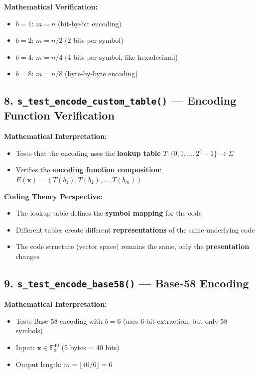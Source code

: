 \documentclass[11pt,a4paper]{article}
\begin{document}
\textbf{Mathematical Verification:}
\begin{itemize}
\item $b = 1$: $m = n$ (bit-by-bit encoding)
\item $b = 2$: $m = n/2$ (2 bits per symbol)
\item $b = 4$: $m = n/4$ (4 bits per symbol, like hexadecimal)
\item $b = 8$: $m = n/8$ (byte-by-byte encoding)
\end{itemize}

\subsection{8. \texttt{s\_test\_encode\_custom\_table()} --- Encoding Function Verification}

\textbf{Mathematical Interpretation:}
\begin{itemize}
\item Tests that the encoding uses the \textbf{lookup table} $T: \{0, 1, \ldots, 2^b-1\} \rightarrow \Sigma$
\item Verifies the \textbf{encoding function composition}: $E(\mathbf{x}) = (T(b_1), T(b_2), \ldots, T(b_m))$
\end{itemize}

\textbf{Coding Theory Perspective:}
\begin{itemize}
\item The lookup table defines the \textbf{symbol mapping} for the code
\item Different tables create different \textbf{representations} of the same underlying code
\item The code structure (vector space) remains the same, only the \textbf{presentation} changes
\end{itemize}

\subsection{9. \texttt{s\_test\_encode\_base58()} --- Base-58 Encoding}

\textbf{Mathematical Interpretation:}
\begin{itemize}
\item Tests Base-58 encoding with $b = 6$ (uses 6-bit extraction, but only 58 symbols)
\item Input: $\mathbf{x} \in \mathbb{F}_2^{40}$ (5 bytes = 40 bits)
\item Output length: $m = \lfloor 40/6 \rfloor = 6$
\end{itemize}
\end{document}
